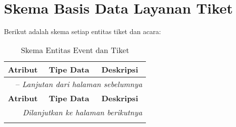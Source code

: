 \chapter{Skema Basis Data Layanan Tiket}
\label{apx:ticket-schema}

Berikut adalah skema setiap entitas tiket dan acara:

\begingroup
\footnotesize
\begin{longtable}{|l|p{}|p{}|}
	\caption{Skema Entitas Event dan Tiket}                                                                                             \\
	\hline
	\textbf{Atribut}     & \textbf{Tipe Data}    & \textbf{Deskripsi}                                                                   \\
	\endfirsthead

	\multicolumn{3}{|l|}{\tablename\ \thetable\ -- \textit{Lanjutan dari halaman sebelumnya}}                                           \\
	\hline
	\textbf{Atribut}     & \textbf{Tipe Data}    & \textbf{Deskripsi}                                                                   \\
	\endhead

	\hline
	\multicolumn{3}{|r|}{\textit{Dilanjutkan ke halaman berikutnya}}                                                                    \\
	\endfoot

	\hline
	\endlastfoot


\end{longtable}
